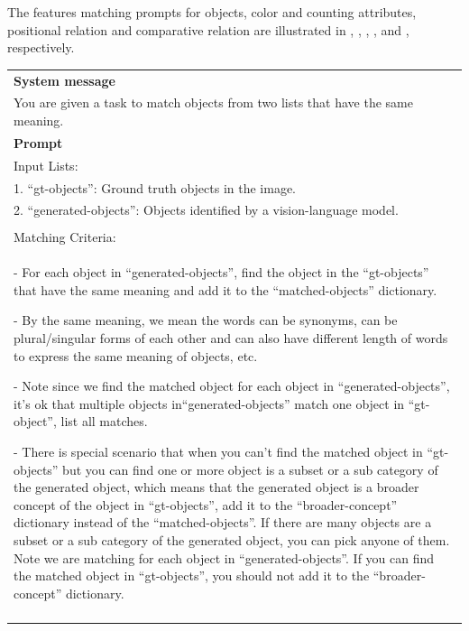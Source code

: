The features matching prompts for objects, color and counting attributes, positional relation and comparative relation are illustrated in , , , , and  , respectively. 



\begin{table}[h!]\centering
\begin{minipage}{0.95\textwidth} 
\centering
\begin{tcolorbox} 
    \centering
      \small
    \begin{tabular}{p{}}
   { {\bf System message} } \\
You are given a task to match objects from two lists that have the same meaning. \\
    \midrule
    {\bf Prompt}  \\
        
        Input Lists:\\
        
        1. ``gt-objects'': Ground truth objects in the image.\\
        2. ``generated-objects'': Objects identified by a vision-language model. \\\\

        Matching Criteria: \\
        - For each object in ``generated-objects'', find the object in the ``gt-objects'' that have the same meaning and add it to the ``matched-objects'' dictionary.
        
        - By the same meaning, we mean the words can be synonyms, can be plural/singular forms of each other and can also have different length of words to express the same meaning of objects, etc.
        
        - Note since we find the matched object for each object in ``generated-objects'', it's ok that multiple objects in``generated-objects'' match one object in ``gt-object'', list all matches.
        
        - There is special scenario that when you can't find the matched object in ``gt-objects'' but you can find one or more object is a subset or a sub category of the generated object, which means that the generated object is a broader concept of the object in ``gt-objects'', add it to the ``broader-concept'' dictionary instead of the ``matched-objects''. If there are many objects are a subset or a sub category of the generated object, you can pick anyone of them. Note we are matching for each object in ``generated-objects''. If you can find the matched object in ``gt-objects'', you should not add it to the ``broader-concept'' dictionary. \\\\
        

\end{tabular}
\end{tcolorbox}
\end{minipage}
\end{table}
